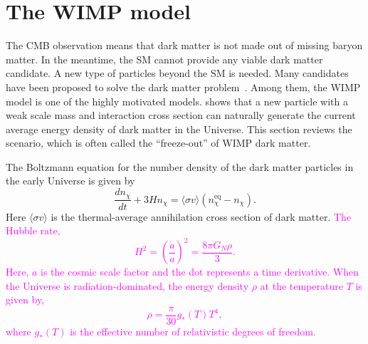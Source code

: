 \documentclass[doublespace,nopageskip]{VTthesis} %
\newcommand{\DS}[1]{\textcolor{magenta}{#1}}
\begin{document}
\section{The WIMP model}\label{se:wimp}

The CMB observation means that dark matter is not made out of missing baryon matter. In the meantime, the SM cannot provide any viable dark matter candidate. A new type of particles beyond the SM is needed.  Many candidates have been proposed to solve the dark matter problem~\cite{2005PhR...405..279B}. Among them, the WIMP model is one of the highly motivated models. \citet{1979ARNPS..29..313S} shows that a new particle with a weak scale mass and interaction cross section can naturally generate the current average energy density of dark matter in the Universe. This section reviews the scenario, which is often called the ``freeze-out'' of WIMP dark matter.

The Boltzmann equation for the number density of the dark matter particles in the early Universe is given by
\begin{equation}
    \frac{dn_\chi}{dt} + 3Hn_\chi = \langle\sigma v\rangle(n_\chi^{\mathrm{eq}} - n_\chi).
\end{equation}
Here $\langle\sigma v\rangle$ is the thermal-average annihilation cross section of dark matter. \DS{The Hubble rate,
\begin{equation}
    H^2 = \left(\frac{\dot{a}}{{a}}\right)^2 = \frac{8\pi G_N \rho}{3}.
\end{equation}
Here, $a$ is the cosmic scale factor and the dot represents a time derivative. When the Universe is radiation-dominated, the energy density $\rho$ at the temperature $T$ is given by,
\begin{equation}
    \rho = \frac{\pi}{30}g_*(T)T^4,
\end{equation}
where $g_*(T)$ is the effective number of relativistic degrees of freedom.}

\end{document}
